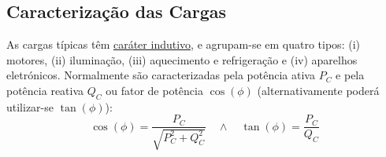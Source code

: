 \subsection{Caracterização das Cargas}

As cargas típicas têm \underline{caráter indutivo}, e agrupam-se em quatro tipos: (i) motores, (ii) iluminação, (iii) aquecimento e refrigeração e (iv) aparelhos eletrónicos. Normalmente são caracterizadas pela potência ativa $P_C$ e pela potência reativa $Q_C$ ou fator de potência $\cos(\phi)$ (alternativamente poderá utilizar-se $\tan(\phi)$):
$$
    \cos(\phi) = \frac{P_C}{\sqrt{P^2_C + Q^2_C}} \quad \land \quad \tan(\phi) = \frac{P_C}{Q_C}
$$

